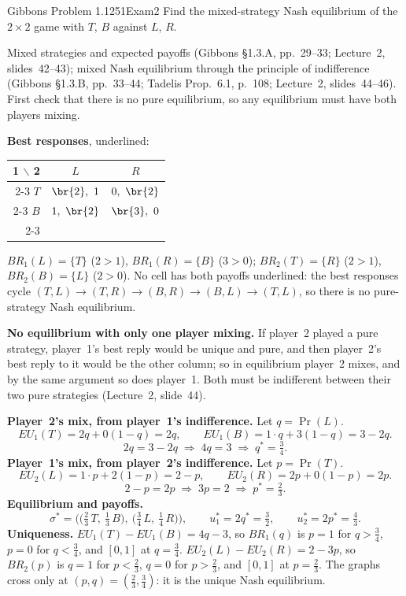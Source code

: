\begin{exsol}{Gibbons Problem 1.12}{51}{Exam}{2}
\asked Find the mixed-strategy Nash equilibrium of the $2\times2$ game with $T$, $B$ against
$L$, $R$.

\method Mixed strategies and expected payoffs (Gibbons \S1.3.A, pp.~29--33; Lecture~2,
slides~42--43); mixed Nash equilibrium through the principle of indifference (Gibbons \S1.3.B,
pp.~33--44; Tadelis Prop.~6.1, p.~108; Lecture~2, slides~44--46). First check that there is no pure
equilibrium, so any equilibrium must have both players mixing.

\solution
\textbf{Best responses}, underlined:
\begin{center}
\begin{tabular}{r|c|c|}
\multicolumn{1}{r}{1 $\backslash$ 2} & \multicolumn{1}{c}{$L$} & \multicolumn{1}{c}{$R$}\\ \cline{2-3}
$T$ & $\br{2},\ 1$ & $0,\ \br{2}$ \\ \cline{2-3}
$B$ & $1,\ \br{2}$ & $\br{3},\ 0$ \\ \cline{2-3}
\end{tabular}
\end{center}
$BR_1(L) = \{T\}$ ($2 > 1$), $BR_1(R) = \{B\}$ ($3 > 0$); $BR_2(T) = \{R\}$ ($2 > 1$),
$BR_2(B) = \{L\}$ ($2 > 0$). No cell has both payoffs underlined: the best responses cycle
$(T,L) \to (T,R) \to (B,R) \to (B,L) \to (T,L)$, so there is no pure-strategy Nash equilibrium.

\textbf{No equilibrium with only one player mixing.} If player~2 played a pure strategy, player~1's
best reply would be unique and pure, and then player~2's best reply to it would be the other
column; so in equilibrium player~2 mixes, and by the same argument so does player~1. Both must be
indifferent between their two pure strategies (Lecture~2, slide~44).

\textbf{Player~2's mix, from player~1's indifference.} Let $q = \Pr(L)$.
\[
  EU_1(T) = 2q + 0(1-q) = 2q, \qquad EU_1(B) = 1\cdot q + 3(1-q) = 3 - 2q .
\]
\[
  2q = 3 - 2q \;\Longrightarrow\; 4q = 3 \;\Longrightarrow\; q^* = \tfrac34 .
\]
\textbf{Player~1's mix, from player~2's indifference.} Let $p = \Pr(T)$.
\[
  EU_2(L) = 1\cdot p + 2(1-p) = 2 - p, \qquad EU_2(R) = 2p + 0(1-p) = 2p .
\]
\[
  2 - p = 2p \;\Longrightarrow\; 3p = 2 \;\Longrightarrow\; p^* = \tfrac23 .
\]
\textbf{Equilibrium and payoffs.}
\[
  \sigma^* = \Big(\big(\tfrac23\,T,\ \tfrac13\,B\big),\ \big(\tfrac34\,L,\ \tfrac14\,R\big)\Big),
  \qquad u_1^* = 2q^* = \tfrac32, \qquad u_2^* = 2p^* = \tfrac43 .
\]
\textbf{Uniqueness.} $EU_1(T) - EU_1(B) = 4q - 3$, so $BR_1(q)$ is $p = 1$ for $q > \tfrac34$,
$p = 0$ for $q < \tfrac34$, and $[0,1]$ at $q = \tfrac34$. $EU_2(L) - EU_2(R) = 2 - 3p$, so
$BR_2(p)$ is $q = 1$ for $p < \tfrac23$, $q = 0$ for $p > \tfrac23$, and $[0,1]$ at
$p = \tfrac23$. The graphs cross only at $(p,q) = (\tfrac23, \tfrac34)$: it is the unique Nash
equilibrium.


\end{exsol}
